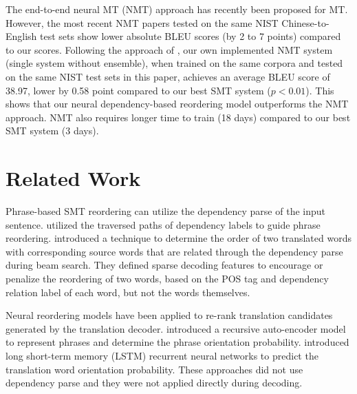 \documentclass[letterpaper]{article}
\begin{document}
The end-to-end neural MT (NMT) approach has recently been proposed for MT. However, the most recent NMT papers tested on the same NIST Chinese-to-English test sets \cite{wang_memory-enhanced_2016,zhang_variational_2016} show lower absolute BLEU scores (by 2 to 7 points) compared to our scores. Following the approach of \cite{junczys-dowmunt_is_2016}, our own implemented NMT system (single system without ensemble), when trained on the same corpora and tested on the same NIST test sets in this paper, achieves an average BLEU score of 38.97, lower by 0.58 point compared to our best SMT system ($p<0.01$). This shows that our neural dependency-based reordering model outperforms the NMT approach. NMT also requires longer time to train (18 days) compared to our best SMT system (3 days).

\section{Related Work}

Phrase-based SMT reordering can utilize the dependency parse of the input sentence. \citeauthor{chang_discriminative_2009}  utilized the traversed paths of dependency labels to guide phrase reordering. \citeauthor{hadiwinoto_swap_2016}  introduced a technique to determine the order of two translated words with corresponding source words that are related through the dependency parse during beam search. They defined sparse decoding features to encourage or penalize the reordering of two words, based on the POS tag and dependency relation label of each word, but not the words themselves.

Neural reordering models have been applied to re-rank translation candidates generated by the translation decoder. \citeauthor{li_neural_2014}  introduced a recursive auto-encoder model to represent phrases and determine the phrase orientation probability. \citeauthor{cui_lstm_2016}  introduced long short-term memory (LSTM) recurrent neural networks to predict the translation word orientation probability. These approaches did not use dependency parse and they were not applied directly during decoding.
\end{document}
